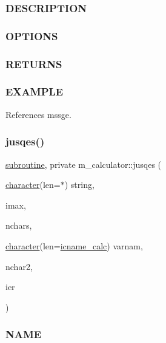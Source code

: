 \subsubsection*{D\+E\+S\+C\+R\+I\+P\+T\+I\+ON}

\subsubsection*{O\+P\+T\+I\+O\+NS}

\subsubsection*{R\+E\+T\+U\+R\+NS}

\subsubsection*{E\+X\+A\+M\+P\+LE}

References mssge.

\mbox{\label{namespacem__calculator_a1c053df0b605f7d96a5982c44a9a1d11}} 
\subsubsection{\texorpdfstring{jusqes()}{jusqes()}}
{\footnotesize\ttfamily \hyperlink{M__stopwatch_83_8txt_acfbcff50169d691ff02d4a123ed70482}{subroutine}, private m\+\_\+calculator\+::jusqes (\begin{DoxyParamCaption}\item[{\hyperlink{option__stopwatch_83_8txt_abd4b21fbbd175834027b5224bfe97e66}{character}(len=$\ast$)}]{string,  }\item[{}]{imax,  }\item[{}]{nchars,  }\item[{\hyperlink{option__stopwatch_83_8txt_abd4b21fbbd175834027b5224bfe97e66}{character}(len=\hyperlink{namespacem__calculator_a482f8880712dc8f52ef6833de3243875}{icname\+\_\+calc})}]{varnam,  }\item[{}]{nchar2,  }\item[{}]{ier }\end{DoxyParamCaption})\hspace{0.3cm}{\ttfamily [private]}}



\subsubsection*{N\+A\+ME}

